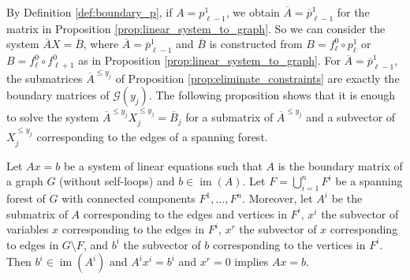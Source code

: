 \documentclass[english,a4paper,nolineno,cleveref]{socg-lipics-v2021}
\DeclareMathOperator{\im}{im}
\begin{document}
By Definition \ref{def:boundary_p}, if $A=p_{\ell\minus 1}^1$, we obtain $\overline{A}=\overline{p}_{\ell\minus 1}^1$ for the matrix in Proposition \ref{prop:linear_system_to_graph}. So we can consider the system $\overline{A}X=\overline{B}$, where $\overline{A}=\overline{p}_{\ell\minus 1}^1$ and $\overline{B}$ is constructed from $B=f^0_\ell\circ p_\ell^1$ or $B=f^0_\ell\circ f^0_{\ell+1}$ as in Proposition \ref{prop:linear_system_to_graph}. For $\overline{A}=\overline{p}_{\ell\minus 1}^1$, the submatrices $\overline{A}^{\leq y_j}$ of Proposition \ref{prop:eliminate_constraints} are exactly the boundary matrices of $\mathcal{G}(y_j)$.  The following proposition shows that it is enough to solve the system $\overline{A}^{\leq y_j}X^{\leq y_j}_j=\overline{B}_j$ for a submatrix of $\overline{A}^{\leq y_j}$ and a subvector of $X^{\leq y_j}_j$ corresponding to the edges of a spanning forest.  


\begin{proposition} \label{prop:graph_equation}
Let $Ax=b$ be a system of linear equations such that $A$ is the boundary matrix of a graph $G$ (without self-loops) and $b\in \im(A)$. Let $F=\bigcup_{i=1}^n F^i$ be a spanning forest of $G$ with connected components $F^1,\ldots,F^n$. Moreover, let $A^i$ be the submatrix of $A$ corresponding to the edges and vertices in $F^i$, $x^i$ the subvector of variables $x$ corresponding to the edges in $F^i$, $x^r$ the subvector of $x$ corresponding to edges in $G\setminus F$, and $b^i$ the subvector of $b$ corresponding to the vertices in $F^i$. Then $b^i\in\im(A^i)$ and $A^ix^i=b^i$ and $x^r=0$ implies $Ax=b$.  
\end{proposition}
\end{document}
